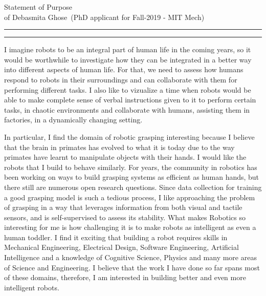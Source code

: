 \documentclass[10pt]{article}
\newcommand{\soptitle}{Statement of Purpose}
\newcommand{\yourname}{Debasmita Ghose}
\begin{document}
\begin{center}\LARGE\soptitle\\
\large of \yourname\ (PhD applicant for Fall-2019 - MIT Mech)
\end{center}

\hrule
\vspace{0pt}
\hrule height 1pt

\bigskip

I imagine robots to be an integral part of human life in the coming years, so it would be worthwhile to investigate how they can be integrated in a better way into different aspects of human life. For that, we need to assess how humans respond to robots in their surroundings and can collaborate with them for performing different tasks. I also like to vizualize a time when robots would be able to make complete sense of verbal instructions given to it to perform certain tasks, in chaotic environments and collaborate with humans, assisting them in factories, in a dynamically changing setting.
\par
  In particular, I find the domain of robotic grasping interesting because I believe that the brain in primates has evolved to what it is today due to the way primates have learnt to manipulate objects with their hands. I would like the robots that I build to behave similarly. For years, the community in robotics has been working on ways to build grasping systems as efficient as  human hands, but there still are numerous open research questions. Since data collection for training a good grasping model is such a tedious process,  I like approaching the problem of grasping in a way that leverages information from both visual and tactile sensors, and is self-supervised to assess its stability. What makes Robotics so interesting for me is how challenging it is to make robots as intelligent as even a human toddler. I find it exciting that building a robot requires skills in Mechanical Engineering, Electrical Design, Software Engineering, Artificial Intelligence and a knowledge of Cognitive Science, Physics and many more areas of Science and Engineering. I believe that the work I have done so far spans most of these domains, therefore, I am interested in building better and even more intelligent robots.    
\par
\end{document}
